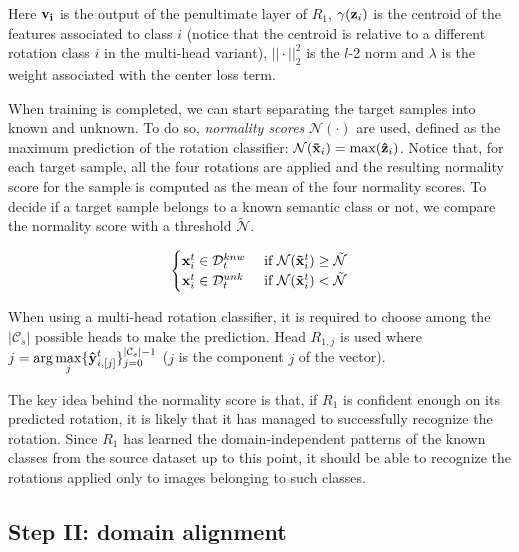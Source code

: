\documentclass[10pt,twocolumn,letterpaper]{article}
\begin{document}
Here ${\bf v_i}$ is the output of the penultimate layer of $R_1$,
$\gamma({\bf z}_i)$ is the centroid of the features associated to class $i$
(notice that the centroid is relative to a different rotation class $i$ in the multi-head variant),
$||\cdot||_2^2$ is the $l$-2 norm and $\lambda$ is the weight associated with the center loss term.

When training is completed, 
we can start separating the target samples into known and unknown.
To do so,
{\it normality scores} $\mathcal{N}(\cdot)$ are used,
defined as the maximum prediction of the rotation classifier:
$\mathcal{N}({\bf\tilde{x}}_i) = \max({\bf\hat{z}}_i)$.
Notice that, for each target sample, all the four rotations are applied and the resulting normality score for the sample
is computed as the mean of the four normality scores.
To decide if a target sample belongs to a known semantic class or not, we compare the normality score with a threshold $\tilde{\mathcal{N}}$.

\begin{equation}
  \begin{cases}
    {\bf x}_i^t \in \mathcal{D}_t^{knw} & \text{ if } \mathcal{N}({\bf\tilde x}_i^t) \geq \tilde{\mathcal{N}} \\
    {\bf x}_i^t \in \mathcal{D}_t^{unk} & \text{ if } \mathcal{N}({\bf\tilde x}_i^t) < \tilde{\mathcal{N}}
  \end{cases}
  \label{eq:sample_separation}
\end{equation}

When using a multi-head rotation classifier, 
it is required to choose among the $|\mathcal{C}_s|$ possible heads to make the prediction.
Head $R_{1,j}$ is used where $\displaystyle j = \arg\max_j \{{\bf\hat{y}}_{i, [j]}^t\}_{j=0}^{|\mathcal{C}_s|-1}$
($j$ is the component $j$ of the vector).

The key idea behind the normality score is that, if $R_1$ is confident enough on its predicted rotation,
it is likely that it has managed to successfully recognize the rotation.
Since $R_1$ has learned the domain-independent patterns of the known classes from the source dataset up to this point,
it should be able to recognize the rotations applied only to images belonging to such classes.

\subsection{Step II: domain alignment}
\label{sec:domain_alignment}
\end{document}
